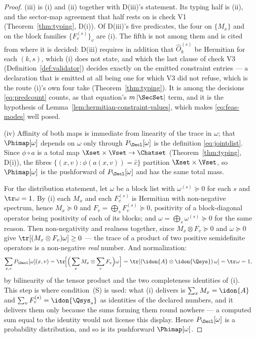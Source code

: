 \begin{proof}
(iii) is (i) and (ii) together with D(iii)'s statement. Its typing half is
(ii), and the sector-map agreement that half rests on is check V1
(Theorem~\ref{thm:typing}, D(i)). Of D(iii)'s five predicates, the four on
$\{M_x\}$ and on the block families $\{F_v^{(s)}\}_v$ are (i). The fifth is
not among them and is cited from where it is decided: D(iii) requires in
addition that $\hat O_k^{(s)}$ be Hermitian for each $(k,s)$, which (i) does
not state, and which the last clause of check V3
(Definition~\ref{def:validator}) decides exactly on the emitted constraint
entries --- a declaration that is emitted at all being one for which V3 did
not refuse, which is the route (i)'s own four take
(Theorem~\ref{thm:typing}). It is among the decisions \eqref{eq:predcount}
counts, as that equation's $m\,|\SecSet|$ term, and it is the hypothesis of
Lemma~\ref{lem:hermitian-constraint-values}, which makes
\eqref{eq:feas-modes} well posed.

(iv) Affinity of both maps is immediate from linearity of the trace in
$\omega$; that $\Phimap[\omega]$ depends on $\omega$ only through
$P_{\Decl}[\omega]$ is the definition \eqref{eq:jointdist}. Since $\phi\circ a$
is a total map $\Xset\times\Vset\to\Chatset$ (Theorem~\ref{thm:typing}, D(i)), the
fibres $\{(x,v):\phi(a(x,v))=\hat c\}$ partition $\Xset\times\Vset$, so
$\Phimap[\omega]$ is the pushforward of $P_{\Decl}[\omega]$ and has the same
total mass.

For the distribution statement, let $\omega$ be a block list with
$\omega^{(s)}\succeq0$ for each $s$ and $\tr\omega=1$. By (i) each $M_x$ and
each $F_v^{(s)}$ is Hermitian with non-negative spectrum, hence
$M_x\succeq0$ and $F_v=\bigoplus_sF_v^{(s)}\succeq0$, positivity of a
block-diagonal operator being positivity of each of its blocks; and
$\omega=\bigoplus_s\omega^{(s)}\succeq0$ for the same reason. Then
non-negativity and realness together, since $M_x\otimes F_v\succeq0$ and
$\omega\succeq0$ give $\tr[(M_x\otimes F_v)\omega]\ge0$ --- the trace of a
product of two positive semidefinite operators is a non-negative \emph{real}
number. And normalization:
\begin{equation*}
  \sum_{x,v}P_{\Decl}[\omega](x,v)
  =\tr\!\Big[\Big(\sum_xM_x\otimes\sum_vF_v\Big)\omega\Big]
  =\tr[(\idon{A}\otimes\idon{\Qsys})\,\omega]=\tr\omega=1 ,
\end{equation*}
by bilinearity of the tensor product and the two completeness identities of
(i). This step is where condition~(S) is used: what (i) delivers is
$\sum_xM_x=\idon{A}$ and $\sum_vF_v^{(s)}=\idon{\Qsys_s}$ as identities of the
declared numbers, and it delivers them only because the sums forming them round
nowhere --- a computed sum equal to the identity would not license this
display. Hence $P_{\Decl}[\omega]$ is a probability distribution, and so is its
pushforward $\Phimap[\omega]$.


\end{proof}
